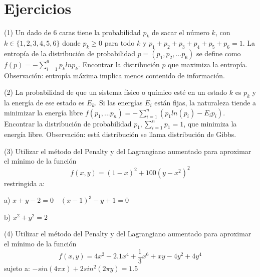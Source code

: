 \section*{Ejercicios}
\noindent (1) Un dado de 6 caras tiene la probabilidad $p_k$ de sacar el número $k$, con $k \in \{ 1, 2, 3, 4, 5, 6 \}$ donde $p_k \geq 0$ para todo $k$ y $p_1 + p_2 + p_3 + p_4 + p_5 + p_6 = 1$. La entropía de la distribución de probabilidad $p = (p_1, p_2, ...p_6)$ se define como $f(p) = - \sum_{i = 1}^{6} p_k ln p_k$. Encontrar la distribución $p$ que maximiza la entropía. Observación: entropía máxima implica menos contenido de información.

\noindent (2) La probabilidad de que un sistema físico o químico esté en un estado $k$ es $p_k$ y la energía de ese estado es $E_k$. Si las energías $E_i$ están fijas, la naturaleza tiende a minimizar la energía libre $f(p_1,...p_n) = - \sum_{i = 1}^{n} (p_1 ln(p_i) - E_i p_i)$. Encontrar la distribución de probabilidad $p_1, \sum_{i = 1}^{n} p_1 = 1$, que minimiza la energía libre. Observación: está distribución se llama distribución de Gibbs.

\noindent (3) Utilizar el método del Penalty y del Lagrangiano aumentado para aproximar el mínimo de la función
\[ f(x,y) = (1 - x)^2 + 100 (y - x^2)^2 \]
restringida a:

a) $x + y - 2 = 0 \quad (x - 1)^3 - y + 1 = 0$

b) $x^2 + y^2 = 2$

\noindent (4) Utilizar el método del Penalty y del Lagrangiano aumentado para aproximar el mínimo de la función
\[ f(x, y) = 4x^2 - 2.1 x^4 + \frac{1}{3}x^6 + xy - 4y^2 + 4y^4 \]
sujeto a: $-sin(4\pi x) + 2 sin^2(2 \pi y) = 1.5$